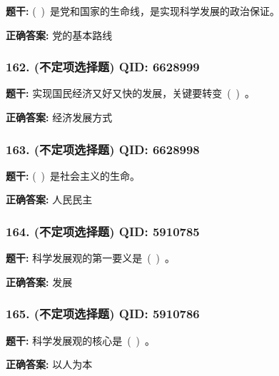 \documentclass[12pt,UTF8]{ctexart}
\begin{document}
\textbf{题干:}
( ) 是党和国家的生命线，是实现科学发展的政治保证。

\textbf{正确答案:}
党的基本路线

\vspace{0.3em}\hrulefill\vspace{0.7em}

\subsubsection*{162. (不定项选择题) \small QID: 6628999}

\textbf{题干:}
实现国民经济又好又快的发展，关键要转变 ( ) 。

\textbf{正确答案:}
经济发展方式

\vspace{0.3em}\hrulefill\vspace{0.7em}

\subsubsection*{163. (不定项选择题) \small QID: 6628998}

\textbf{题干:}
( ) 是社会主义的生命。

\textbf{正确答案:}
人民民主

\vspace{0.3em}\hrulefill\vspace{0.7em}

\subsubsection*{164. (不定项选择题) \small QID: 5910785}

\textbf{题干:}
科学发展观的第一要义是 ( ) 。

\textbf{正确答案:}
发展

\vspace{0.3em}\hrulefill\vspace{0.7em}

\subsubsection*{165. (不定项选择题) \small QID: 5910786}

\textbf{题干:}
科学发展观的核心是 ( ) 。

\textbf{正确答案:}
以人为本

\vspace{0.3em}\hrulefill\vspace{0.7em}
\end{document}
